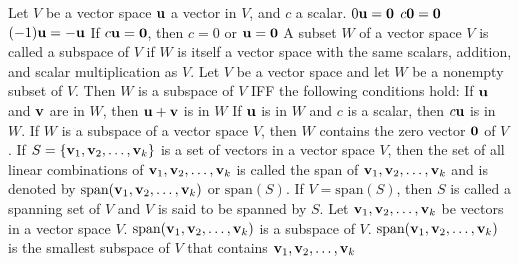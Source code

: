 \documentclass{article}
\begin{document}
    \begin{outline}
        \1 Let $V$ be a vector space \(\vb u\) a vector in $V$, and $c$ a scalar. 
            \2 \(0\vb u=\vb 0\)
            \2 \(c\vb 0=\vb 0\)
            \2 \((-1)\vb u=-\vb u\)
            \2 If \(c\vb u=\vb 0\), then \(c=0\) or \(\vb u=\vb 0\)
        \1 A subset $W$ of a vector space $V$ is called a subspace of $V$ if $W$ is itself a vector space with the same scalars, addition, and scalar multiplication as $V$. 
        \1 Let $V$ be a vector space and let $W$ be a nonempty subset of $V$. Then $W$ is a subspace of $V$ IFF the following conditions hold: 
            \2 If \(\vb u\) and \(\vb v\) are in $W$, then \(\vb u+\vb v\) is in \(W\)
            \2 If \(\vb u\) is in $W$ and $c$ is a scalar, then \(c\vb u\) is in $W$. 
        \1 If $W$ is a subspace of a vector space $V$, then $W$ contains the zero vector \(\vb 0\) of $V$. 
        \1 If \(S=\{\vb v_1,\vb v_2,\ldots,\vb v_k\}\) is a set of vectors in a vector space $V$, then the set of all linear combinations of \(\vb v_1,\vb v_2,\ldots,\vb v_k\) is called the span of \(\vb v_1,\vb v_2,\ldots,\vb v_k\) and is denoted by \(\text{span}(\vb v_1,\vb v_2,\ldots,\vb v_k)\) or \(\text{span}(S)\). If \(V=\text{span}(S)\), then $S$ is called a spanning set of $V$ and $V$ is said to be spanned by $S$. 
        \1 Let \(\vb v_1,\vb v_2,\ldots,\vb v_k\) be vectors in a vector space $V$. 
            \2 \(\text{span}(\vb v_1,\vb v_2,\ldots,\vb v_k)\) is a subspace of $V$. 
            \2 \(\text{span}(\vb v_1,\vb v_2,\ldots,\vb v_k)\) is the smallest subspace of $V$ that contains \(\vb v_1,\vb v_2,\ldots,\vb v_k\)

    \end{outline}
\end{document}
